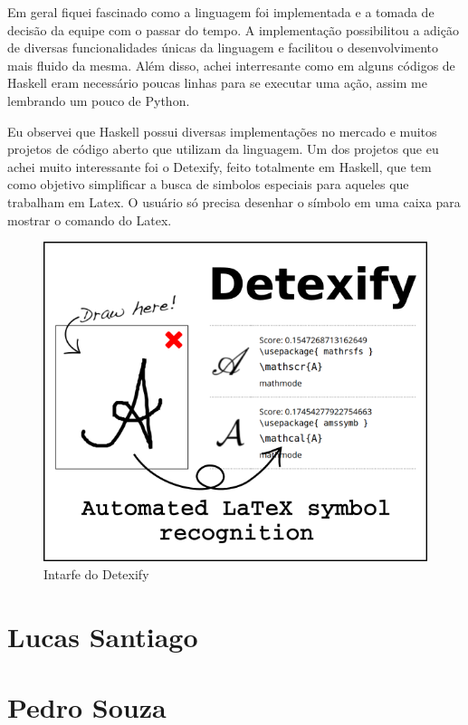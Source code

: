 \documentclass[
  article,			       %
  12pt,				         %
  oneside,			       %
  a4paper,			       %
  english,		       	 %
  brazil,			      	 %
  sumario=tradicional
]{abntex2}
\begin{document}
\begin{apendicesenv}
        Em geral fiquei fascinado como a linguagem foi implementada e a tomada de decisão da equipe com o passar do tempo. A implementação
        possibilitou a adição de diversas funcionalidades únicas da linguagem e facilitou o desenvolvimento mais fluido da mesma.
        Além disso, achei interresante como em alguns códigos de Haskell eram necessário poucas linhas para se executar uma ação, assim
        me lembrando um pouco de Python.

        Eu observei que Haskell possui diversas implementações no mercado e muitos projetos de código aberto que utilizam da linguagem.
        Um dos projetos que eu achei muito interessante foi o Detexify, feito totalmente em Haskell, que tem como objetivo simplificar a 
        busca de simbolos especiais para aqueles que trabalham em Latex. O usuário só precisa desenhar o símbolo em uma caixa para mostrar 
        o comando do Latex.
        
        \begin{figure}[ht]
          \includegraphics[width =\textwidth]{detexify.png}
          \caption{Intarfe do Detexify}
        \end{figure}
        
        \newpage 

        \chapter{Lucas Santiago}

        \newpage

        \chapter{Pedro Souza}
    
    \end{apendicesenv}
\end{document}
